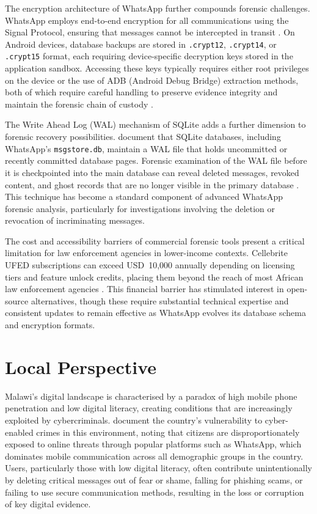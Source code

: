 \documentclass[12pt,a4paper]{report}
\begin{document}
The encryption architecture of WhatsApp further compounds forensic challenges. WhatsApp employs end-to-end encryption for all communications using the Signal Protocol, ensuring that messages cannot be intercepted in transit \citep{vijayan2018, nishchal2024}. On Android devices, database backups are stored in \texttt{.crypt12}, \texttt{.crypt14}, or \texttt{.crypt15} format, each requiring device-specific decryption keys stored in the application sandbox. Accessing these keys typically requires either root privileges on the device or the use of ADB (Android Debug Bridge) extraction methods, both of which require careful handling to preserve evidence integrity and maintain the forensic chain of custody \citep{kent2006}.

The Write Ahead Log (WAL) mechanism of SQLite adds a further dimension to forensic recovery possibilities. \citet{nishchal2024} document that SQLite databases, including WhatsApp's \texttt{msgstore.db}, maintain a WAL file that holds uncommitted or recently committed database pages. Forensic examination of the WAL file before it is checkpointed into the main database can reveal deleted messages, revoked content, and ghost records that are no longer visible in the primary database \citep{nishchal2024}. This technique has become a standard component of advanced WhatsApp forensic analysis, particularly for investigations involving the deletion or revocation of incriminating messages.

The cost and accessibility barriers of commercial forensic tools present a critical limitation for law enforcement agencies in lower-income contexts. Cellebrite UFED subscriptions can exceed USD~10,000 annually depending on licensing tiers and feature unlock credits, placing them beyond the reach of most African law enforcement agencies \citep{reddit2023}. This financial barrier has stimulated interest in open-source alternatives, though these require substantial technical expertise and consistent updates to remain effective as WhatsApp evolves its database schema and encryption formats.

\section{Local Perspective}

Malawi's digital landscape is characterised by a paradox of high mobile phone penetration and low digital literacy, creating conditions that are increasingly exploited by cybercriminals. \citet{kajoloweka2022} document the country's vulnerability to cyber-enabled crimes in this environment, noting that citizens are disproportionately exposed to online threats through popular platforms such as WhatsApp, which dominates mobile communication across all demographic groups in the country. Users, particularly those with low digital literacy, often contribute unintentionally by deleting critical messages out of fear or shame, falling for phishing scams, or failing to use secure communication methods, resulting in the loss or corruption of key digital evidence.
\end{document}
